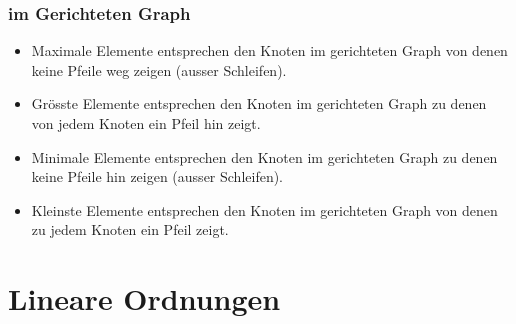 \subsubsection{im Gerichteten Graph}
\begin{itemize}
    \item Maximale Elemente entsprechen den Knoten im gerichteten
    Graph von denen keine Pfeile weg zeigen (ausser Schleifen).
    \item Grösste Elemente entsprechen den Knoten im gerichteten
    Graph zu denen von jedem Knoten ein Pfeil hin zeigt.
    \item Minimale Elemente entsprechen den Knoten im gerichteten
    Graph zu denen keine Pfeile hin zeigen (ausser Schleifen).
    \item Kleinste Elemente entsprechen den Knoten im gerichteten
    Graph von denen zu jedem Knoten ein Pfeil zeigt.
\end{itemize}
\section{Lineare Ordnungen}

